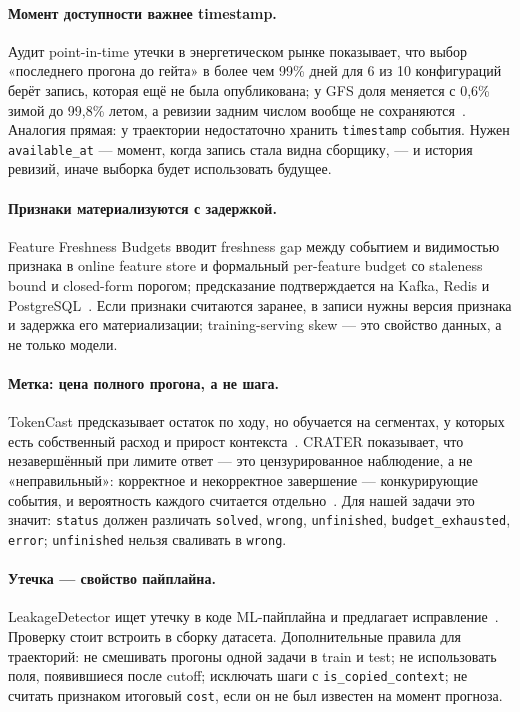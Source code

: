 \documentclass[11pt,a4paper]{article}
\begin{document}
\paragraph{Момент доступности важнее timestamp.}
Аудит point-in-time утечки в энергетическом рынке показывает, что выбор
«последнего прогона до гейта» в более чем 99\% дней для 6 из 10
конфигураций берёт запись, которая ещё не была опубликована; у GFS доля
меняется с 0,6\% зимой до 99,8\% летом, а ревизии задним числом вообще не
сохраняются~\cite{alfalah2026lookahead}. Аналогия прямая: у траектории
недостаточно хранить \texttt{timestamp} события. Нужен
\texttt{available\_at} — момент, когда запись стала видна сборщику, — и
история ревизий, иначе выборка будет использовать будущее.

\paragraph{Признаки материализуются с задержкой.}
Feature Freshness Budgets вводит freshness gap между событием и
видимостью признака в online feature store и формальный per-feature budget
со staleness bound и closed-form порогом; предсказание подтверждается на
Kafka, Redis и PostgreSQL~\cite{rajula2026freshness}. Если признаки
считаются заранее, в записи нужны версия признака и задержка его
материализации; training-serving skew — это свойство данных, а не только
модели.

\paragraph{Метка: цена полного прогона, а не шага.}
TokenCast предсказывает остаток по ходу, но обучается на сегментах,
у которых есть собственный расход и прирост контекста~\cite{ouyang2026tokencast}.
CRATER показывает, что незавершённый при лимите ответ — это цензурированное
наблюдение, а не «неправильный»: корректное и некорректное завершение —
конкурирующие события, и вероятность каждого считается отдельно~\cite{jiang2026crater}.
Для нашей задачи это значит: \texttt{status} должен различать
\texttt{solved}, \texttt{wrong}, \texttt{unfinished},
\texttt{budget\_exhausted}, \texttt{error}; \texttt{unfinished} нельзя
сваливать в \texttt{wrong}.

\paragraph{Утечка — свойство пайплайна.}
LeakageDetector ищет утечку в коде ML-пайплайна и предлагает
исправление~\cite{alomar2025leakagedetector}. Проверку стоит встроить в
сборку датасета. Дополнительные правила для траекторий: не смешивать
прогоны одной задачи в train и test; не использовать поля, появившиеся
после cutoff; исключать шаги с \texttt{is\_copied\_context}; не считать
признаком итоговый \texttt{cost}, если он не был известен на момент
прогноза.
\end{document}
